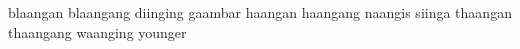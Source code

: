 blaangan
blaangang
diinging
gaambar
haangan
haangang
naangis
siinga
thaangan
thaangang
waanging
younger
